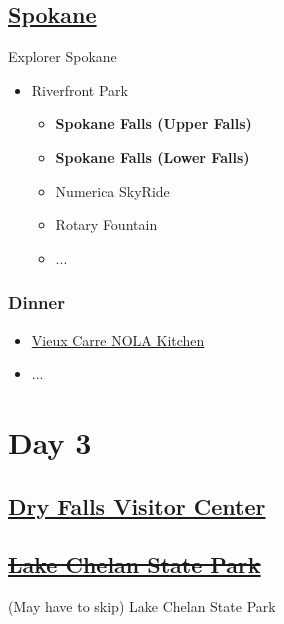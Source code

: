 \documentclass{article}
\newcommand{\Spokane}{\href{https://google.com}{Spokane}}
\newcommand{\DryFallsVisitorCenter}{\href{https://maps.app.goo.gl/ikKJMB3SaaTAfcYT9}{Dry Falls Visitor Center}}
\newcommand{\LakeChelanStatePark}{\href{https://maps.app.goo.gl/SG8UQnPoWd1ubnXq7}{\sout{Lake Chelan State Park}}}
\begin{document}
\subsection{\Spokane}
Explorer Spokane
\begin{itemize}
  \item{Riverfront Park}
  \begin{itemize}
    \item{\textbf{Spokane Falls (Upper Falls)}}
    \item{\textbf{Spokane Falls (Lower Falls)}}
    \item{Numerica SkyRide}
    \item{Rotary Fountain}
    \item{...}
  \end{itemize}
\end{itemize}

\subsubsection{Dinner}
\begin{itemize}
  \item{\href{https://maps.app.goo.gl/xVXrV7TUJmNi5Nha8}{Vieux Carre NOLA Kitchen}}
  \item{...}
\end{itemize}

\section{Day 3}
  \begin{figure}[H]
    \centering
  \end{figure}
\subsection{\DryFallsVisitorCenter}


\subsection{\LakeChelanStatePark}
(May have to skip)
Lake Chelan State Park
\end{document}
